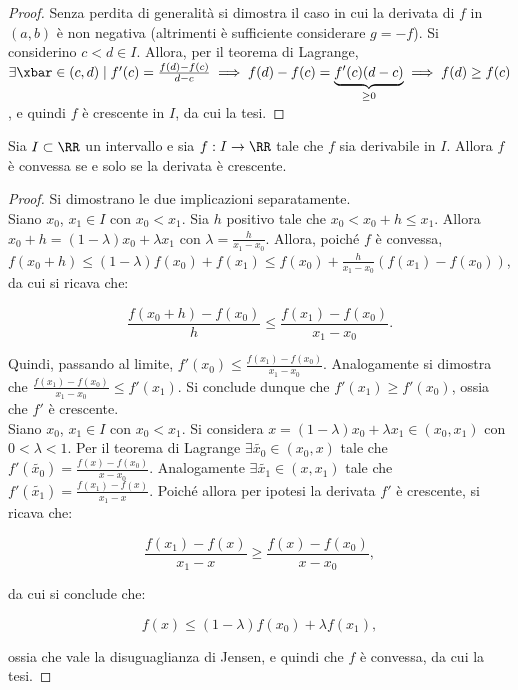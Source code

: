 \documentclass[11pt]{article}
\begin{document}
	\begin{proof}
		Senza perdita di generalità si dimostra il caso in cui la derivata
		di $f$ in $(a, b)$ è non negativa (altrimenti è sufficiente considerare
		$g = -f$).
		Si considerino $c < d \in I$. Allora, per il teorema di Lagrange,
		$\exists \xbar \in (c, d) \mid f'(c) = \frac{f(d) - f(c)}{d-c}
		\implies f(d) - f(c) = \underbrace{f'(c) (d-c)}_{\geq 0} \implies
		f(d) \geq f(c)$, e quindi $f$ è crescente in $I$, da cui la tesi.
	\end{proof}

	\begin{proposition}
		Sia $I \subset \RR$ un intervallo e sia $f : I \to \RR$ tale che $f$
		sia derivabile in $I$. Allora $f$ è convessa
		se e solo se la derivata è crescente.
	\end{proposition}

	\begin{proof} Si dimostrano le due implicazioni separatamente. \\

		\rightproof Siano $x_0$, $x_1 \in I$ con $x_0 < x_1$. Sia $h$
		positivo tale che $x_0 < x_0 + h \leq x_1$. Allora $x_0 + h = (1- \lambda) x_0 + \lambda x_1$ con $\lambda = \frac{h}{x_1 - x_0}$.
		Allora, poiché $f$ è convessa, $f(x_0 + h) \leq (1- \lambda) f(x_0) + f(x_1) \leq f(x_0) + \frac{h}{x_1 - x_0} \left( f(x_1) - f(x_0) \right)$, da cui si ricava che:
		
		\[ \frac{f(x_0 + h) - f(x_0)}{h} \leq \frac{f(x_1) - f(x_0)}{x_1 - x_0}. \]
		
		Quindi, passando al limite, $f'(x_0) \leq \frac{f(x_1) - f(x_0)}{x_1 - x_0}$. Analogamente si dimostra che $\frac{f(x_1) - f(x_0)}{x_1 - x_0} \leq f'(x_1)$. Si conclude dunque che $f'(x_1) \geq f'(x_0)$, ossia
		che $f'$ è crescente. \\
		
		\leftproof Siano $x_0$, $x_1 \in I$ con $x_0 < x_1$. Si considera
		$x = (1 - \lambda) x_0 + \lambda x_1 \in (x_0, x_1)$ con $0 < \lambda < 1$. Per il teorema di Lagrange $\exists \tilde{x_0} \in (x_0, x)$ tale
		che $f'(\tilde{x_0}) = \frac{f(x) - f(x_0)}{x - x_0}$. Analogamente
		$\exists \tilde{x_1} \in (x, x_1)$ tale che $f'(\tilde{x_1}) =
		\frac{f(x_1) - f(x)}{x_1 - x}$. Poiché allora per ipotesi la
		derivata $f'$ è crescente, si ricava che:
		
		\[ \frac{f(x_1) - f(x)}{x_1 - x} \geq \frac{f(x) - f(x_0)}{x - x_0}, \]
		
		da cui si conclude che:
		
		\[ f(x) \leq (1-\lambda) f(x_0) + \lambda f(x_1), \]
		
		\vskip 0.05in
		
		ossia che vale la disuguaglianza di Jensen, e quindi che
		$f$ è convessa, da cui la tesi.
	\end{proof}
\end{document}
